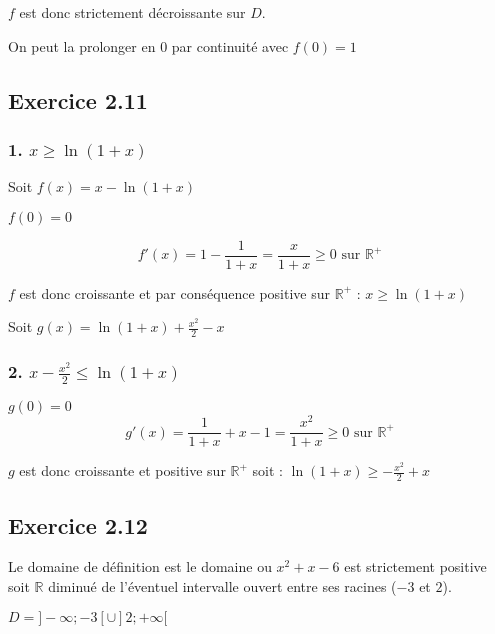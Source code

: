 \documentclass{report}
\begin{document}
$f$ est donc strictement décroissante sur $D$.


On peut la prolonger en $0$ par continuité avec $f(0) = 1$



\subsection*{Exercice 2.11}
\subsubsection*{1. $x \geq \ln(1+x)$}

Soit $f(x) = x - \ln(1+x)$

$f(0) = 0$

\begin{displaymath}
	f'(x) = 1 - \frac{1}{1+x} = \frac{x}{1+x} \geq 0 \text{ sur } \mathbb{R}^{+}
\end{displaymath}

$f$ est donc croissante et par conséquence positive sur $\mathbb{R}^{+}$ : $x \geq \ln(1+x)$

Soit $g(x) = \ln(1+x) + \frac{x^2}{2} - x$

\subsubsection*{2. $x -\frac{x^2}{2} \leq \ln(1+x)$}
$g(0) = 0$
\begin{displaymath}
	g'(x) = \frac{1}{1+x} + x - 1 = \frac{x^2}{1+x} \geq 0 \text{ sur } \mathbb{R}^{+}
\end{displaymath}

$g$ est donc croissante et positive sur $\mathbb{R}^{+}$ soit : $\ln(1+x) \geq -\frac{x^2}{2} + x$

\subsection*{Exercice 2.12}

Le domaine de définition est le domaine ou $x^2 + x -6$ est strictement positive soit $\mathbb{R}$ diminué de l'éventuel
intervalle ouvert entre ses racines ($-3$ et $2$).

$D = ]-\infty ; -3 [ \cup ]2; +\infty[$
\end{document}
